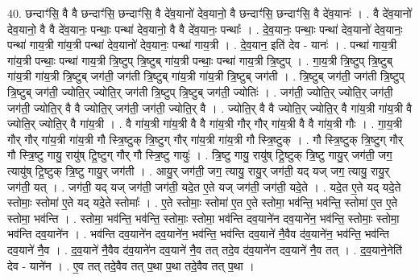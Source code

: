\documentclass[17pt]{extarticle}
\begin{document}
40. छन्दाꣳ॑सि॒ वै वै छन्दाꣳ॑सि॒ छन्दाꣳ॑सि॒ वै दे॑व॒यानो॑ देव॒यानो॒ वै छन्दाꣳ॑सि॒ छन्दाꣳ॑सि॒ वै दे॑व॒यानः॑ । . वै दे॑व॒यानो॑ देव॒यानो॒ वै वै दे॑व॒यानः॒ पन्थाः॒ पन्था॑ देव॒यानो॒ वै वै दे॑व॒यानः॒ पन्थाः᳚ । . दे॒व॒यानः॒ पन्थाः॒ पन्था॑ देव॒यानो॑ देव॒यानः॒ पन्था॑ गाय॒त्री गा॑य॒त्री पन्था॑ देव॒यानो॑ देव॒यानः॒ पन्था॑ गाय॒त्री । . दे॒व॒यान॒ इति॑ देव - यानः॑ । . पन्था॑ गाय॒त्री गा॑य॒त्री पन्थाः॒ पन्था॑ गाय॒त्री त्रि॒ष्टुप् त्रि॒ष्टुब् गा॑य॒त्री पन्थाः॒ पन्था॑ गाय॒त्री त्रि॒ष्टुप् । . गा॒य॒त्री त्रि॒ष्टुप् त्रि॒ष्टुब् गा॑य॒त्री गा॑य॒त्री त्रि॒ष्टुब् जग॑ती॒ जग॑ती त्रि॒ष्टुब् गा॑य॒त्री गा॑य॒त्री त्रि॒ष्टुब् जग॑ती । . त्रि॒ष्टुब् जग॑ती॒ जग॑ती त्रि॒ष्टुप् त्रि॒ष्टुब् जग॑ती॒ ज्योति॒र् ज्योति॒र् जग॑ती त्रि॒ष्टुप् त्रि॒ष्टुब् जग॑ती॒ ज्योतिः॑ । . जग॑ती॒ ज्योति॒र् ज्योति॒र् जग॑ती॒ जग॑ती॒ ज्योति॒र् वै वै ज्योति॒र् जग॑ती॒ जग॑ती॒ ज्योति॒र् वै । . ज्योति॒र् वै वै ज्योति॒र् ज्योति॒र् वै गा॑य॒त्री गा॑य॒त्री वै ज्योति॒र् ज्योति॒र् वै गा॑य॒त्री । . वै गा॑य॒त्री गा॑य॒त्री वै वै गा॑य॒त्री गौर् गौर् गा॑य॒त्री वै वै गा॑य॒त्री गौः । . गा॒य॒त्री गौर् गौर् गा॑य॒त्री गा॑य॒त्री गौ स्त्रि॒ष्टुक् त्रि॒ष्टुग् गौर् गा॑य॒त्री गा॑य॒त्री गौ स्त्रि॒ष्टुक् । . गौ स्त्रि॒ष्टुक् त्रि॒ष्टुग् गौर् गौ स्त्रि॒ष्टु गायु॒ रायु॑ष् ट्रि॒ष्टुग् गौर् गौ स्त्रि॒ष्टु गायुः॑ । . त्रि॒ष्टु गायु॒ रायु॑ष् ट्रि॒ष्टुक् त्रि॒ष्टु गायु॒र् जग॑ती॒ जग॒ त्यायु॑ष् ट्रि॒ष्टुक् त्रि॒ष्टु गायु॒र् जग॑ती । . आयु॒र् जग॑ती॒ जग॒ त्यायु॒ रायु॒र् जग॑ती॒ यद् यज् जग॒ त्यायु॒ रायु॒र् जग॑ती॒ यत् । . जग॑ती॒ यद् यज् जग॑ती॒ जग॑ती॒ यदे॒त ए॒ते यज् जग॑ती॒ जग॑ती॒ यदे॒ते । . यदे॒त ए॒ते यद् यदे॒ते स्तोमाः॒ स्तोमा॑ ए॒ते यद् यदे॒ते स्तोमाः᳚ । . ए॒ते स्तोमाः॒ स्तोमा॑ ए॒त ए॒ते स्तोमा॒ भव॑न्ति॒ भव॑न्ति॒ स्तोमा॑ ए॒त ए॒ते स्तोमा॒ भव॑न्ति । . स्तोमा॒ भव॑न्ति॒ भव॑न्ति॒ स्तोमाः॒ स्तोमा॒ भव॑न्ति दव॒याने॑न दव॒याने॑न॒ भव॑न्ति॒ स्तोमाः॒ स्तोमा॒ भव॑न्ति दव॒याने॑न । . भव॑न्ति दव॒याने॑न दव॒याने॑न॒ भव॑न्ति॒ भव॑न्ति दव॒याने॑ नै॒वैव द॑व॒याने॑न॒ भव॑न्ति॒ भव॑न्ति दव॒याने॑ नै॒व । . द॒व॒याने॑ नै॒वैव द॑व॒याने॑न दव॒याने॑ नै॒व तत् तदे॒व द॑व॒याने॑न दव॒याने॑ नै॒व तत् । . द॒व॒याने॒नेति॑ देव - याने॑न । . ए॒व तत् तदे॒वैव तत् प॒था प॒था तदे॒वैव तत् प॒था । \newline
\pagebreak
{}
\end{document}
